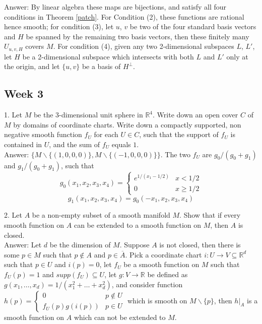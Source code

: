 \documentclass{article}
\theoremstyle{definition}
\begin{document}
Answer: By linear algebra these maps are bijections, and satisfy all four conditions in Theorem \ref{patch}. For Condition (2), these functions are rational hence smooth; for condition (3), let $u$, $v$ be two of the four standard basis vectors and $H$ be spanned by the remaining two basis vectors, then these finitely many $U_{u, v, H}$ covers $M$. For condition (4), given any two 2-dimensional subspaces $L$, $L'$, let $H$ be a 2-dimensional subspace which intersects with both $L$ and $L'$ only at the origin, and let $\{u, v\}$ be a basis of $H^\perp$.

\newpage

\subsection{Week 3}

1. Let $M$ be the 3-dimensional unit sphere in $\mathbb{R}^4$. Write down an open cover $C$ of $M$ by domains of coordinate charts. Write down a compactly supported, non negative smooth function $f_U$ for each $U\in C$, such that the support of $f_U$ is contained in $U$, and the sum of $f_U$ equals $1$.\\

Answer: $\{M\backslash \{(1, 0, 0, 0)\}, M\backslash \{(-1, 0, 0, 0)\}\}$. The two $f_U$ are $g_0/(g_0+g_1)$ and $g_1/(g_0+g_1)$, such that
\[g_0(x_1, x_2, x_3, x_4)=\begin{cases}e^{1/(x_1-1/2)} & x<1/2\\ 0 & x\geq 1/2\end{cases}\]
\[g_1(x_1, x_2, x_3, x_4)=g_0(-x_1, x_2, x_3, x_4)\]

2. Let $A$ be a non-empty subset of a smooth manifold $M$. Show that if every smooth function on $A$ can be extended to a smooth function on $M$, then $A$ is closed.\\

Answer: Let $d$ be the dimension of $M$. Suppose $A$ is not closed, then there is some $p\in M$ such that $p\not\in A$ and $p\in\overline{A}$. Pick a coordinate chart $i: U\rightarrow V\subseteq\mathbb{R}^d$ such that $p\in U$ and $i(p)=0$, let $f_U$ be a smooth function on $M$ such that $f_U(p)=1$ and $supp(f_U)\subseteq U$, let $g:V\rightarrow \mathbb{R}$ be defined as $g(x_1, \dots, x_d)=1/(x_1^2+\dots+x_d^2)$, and consider function $h(p)=\begin{cases}0 & p\not\in U\\ f_U(p)g(i(p)) & p\in U\end{cases}$ which is smooth on $M\backslash \{p\}$, then $h|_A$ is a smooth function on $A$ which can not be extended to $M$.
\end{document}

